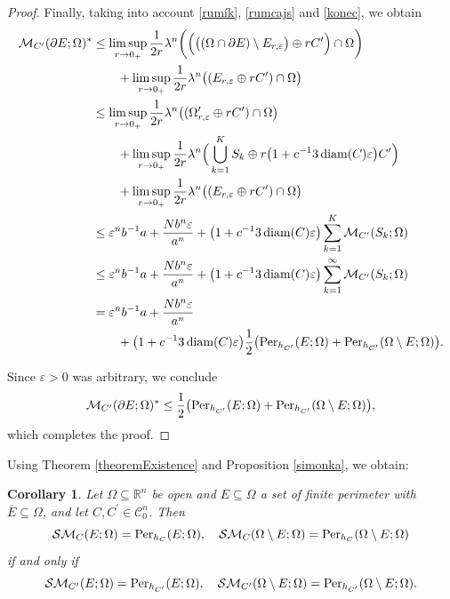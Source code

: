 \documentclass[pdflatex,sn-mathphys-num]{sn-jnl}
\theoremstyle{plain}
\newtheorem{corollary}[theorem]{Corollary}
\theoremstyle{definition}
\DeclareMathOperator{\diam}{\textup{diam}}
\begin{document}
\begin{proof}
Finally, taking into account \eqref{rumík}, \eqref{rumcajs} and \eqref{konec}, we obtain
\[
\begin{split}
\mathcal{M}_{C^{\prime}}(\partial E; \Omega)^* &\leq \limsup_{r\to0_+}\frac{1}{2r}\lambda^n\bigg(\Big(\big((\Omega\cap \partial E)\setminus E_{r, \varepsilon}\big)\oplus rC^{\prime}\Big)\cap\Omega\bigg)\\&\quad\quad+\limsup_{r\to0_+}\frac{1}{2r}\lambda^n\big((E_{r, \varepsilon}\oplus rC^{\prime})\cap\Omega\big)\\
&\leq\limsup_{r\to0_+}\frac{1}{2r}\lambda^n\big((\Omega^{\prime}_{r, \varepsilon}\oplus rC^{\prime})\cap\Omega\big)\\&\quad\quad+\limsup_{r\to0_+}\frac{1}{2r}\lambda^n\Big(\bigcup_{k=1}^K S_k\oplus r\big(1+c^{-1}3\diam(C)\varepsilon\big)C^{\prime}\Big)\\&\quad\quad+\limsup_{r\to0_+}\frac{1}{2r}\lambda^n\big((E_{r, \varepsilon}\oplus rC^{\prime})\cap\Omega\big)\\&\leq \varepsilon^n b^{-1}a+\frac{Nb^n\varepsilon }{a^n} + \big(1+c^{-1}3\diam(C)\varepsilon\big)\sum_{k=1}^K\mathcal{M}_{C^{\prime}}(S_k; \Omega)\\&\leq \varepsilon^n b^{-1}a+\frac{Nb^n\varepsilon }{a^n} + \big(1+c^{-1}3\diam(C)\varepsilon\big)\sum_{k=1}^{\infty}\mathcal{M}_{C^{\prime}}(S_k; \Omega)\\
&= \varepsilon^n b^{-1}a+\frac{Nb^n\varepsilon }{a^n}\\&\quad\quad+ \big(1+c^{-1}3\diam(C)\varepsilon\big)\frac{1}{2}\big(\textup{Per}_{h_{C^{\prime}}}(E; \Omega)+\textup{Per}_{h_{C^{\prime}}}(\Omega\setminus E; \Omega)\big).
\end{split}
\]

Since $\varepsilon>0$ was arbitrary, we conclude
\[
\mathcal{M}_{C^{\prime}}(\partial E; \Omega)^* \leq \frac{1}{2}\big(\textup{Per}_{h_{C^{\prime}}}(E; \Omega)+\textup{Per}_{h_{C^{\prime}}}(\Omega\setminus E; \Omega)\big),
\]
which completes the proof.
\end{proof}


Using Theorem \ref{theoremExistence} and Proposition \ref{simonka}, we obtain:

\begin{corollary}\label{cor}
Let $\Omega\subseteq\mathbb{R}^n$ be open and $E\subseteq\Omega$ a set of finite perimeter with $\overline{E}\subseteq\Omega$, and let $C, C^{\prime}\in\mathcal{C}^n_0$. Then
\[
\mathcal{SM}_C(E; \Omega)=\textup{Per}_{h_C}(E; \Omega), \quad \mathcal{SM}_C(\Omega\setminus E; \Omega)=\textup{Per}_{h_C}(\Omega\setminus E; \Omega)
\]
if and only if
\[
\mathcal{SM}_{C^{\prime}}(E; \Omega)=\textup{Per}_{h_{C^{\prime}}}(E; \Omega), \quad \mathcal{SM}_{C^{\prime}}(\Omega\setminus E; \Omega)=\textup{Per}_{h_{C^{\prime}}}(\Omega\setminus E; \Omega).
\]
\end{corollary}
\end{document}
